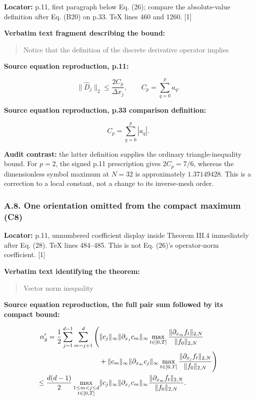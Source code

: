 \textbf{Locator:} p.11, first paragraph below Eq. (26); compare the
absolute-value definition after Eq. (B20) on p.33. TeX lines 460 and
1260. {[}1{]}

\textbf{Verbatim text fragment describing the bound:}

\begin{quote}
Notice that the definition of the discrete derivative operator implies
\end{quote}

\textbf{Source equation reproduction, p.11:}

\[
\|\hat D_j\|_2\leq\frac{2C_p}{\Delta x_j},
\qquad C_p=\sum_{q=0}^{p}a_q.
\]

\textbf{Source equation reproduction, p.33 comparison definition:}

\[
C_p=\sum_{q=0}^{p}|a_q|.
\]

\textbf{Audit contrast:} the latter definition supplies the ordinary
triangle-inequality bound. For \(p=2\), the signed p.11 prescription
gives \(2C_p=7/6\), whereas the dimensionless symbol maximum at \(N=32\)
is approximately \(1.37149428\). This is a correction to a local
constant, not a change to its inverse-mesh order.

\subsubsection{A.8. One orientation omitted from the compact maximum
(C8)}\label{a.8.-one-orientation-omitted-from-the-compact-maximum-c8}

\textbf{Locator:} p.11, unnumbered coefficient display inside Theorem
III.4 immediately after Eq. (28). TeX lines 484--485. This is not Eq.
(26)'s operator-norm coefficient. {[}1{]}

\textbf{Verbatim text identifying the theorem:}

\begin{quote}
Vector norm inequality
\end{quote}

\textbf{Source equation reproduction, the full pair sum followed by its
compact bound:}

\[
\begin{aligned}
\alpha'_g={1\over2}\sum_{j=1}^{d-1}\sum_{m=j+1}^{d}
\Bigg(&\|c_j\|_\infty\|\partial_{x_j}c_m\|_\infty
\max_{t\in[0,T]}\frac{\|\partial_{x_m}f_t\|_{2,N}}{\|f_0\|_{2,N}}
\\
&+\|c_m\|_\infty\|\partial_{x_m}c_j\|_\infty
\max_{t\in[0,T]}\frac{\|\partial_{x_j}f_t\|_{2,N}}{\|f_0\|_{2,N}}\Bigg)
\\
\leq {d(d-1)\over2}
\max_{\substack{1\leq m<j\leq d\\t\in[0,T]}}
&\|c_j\|_\infty\|\partial_{x_j}c_m\|_\infty
\frac{\|\partial_{x_m}f_t\|_{2,N}}{\|f_0\|_{2,N}}.
\end{aligned}
\]

